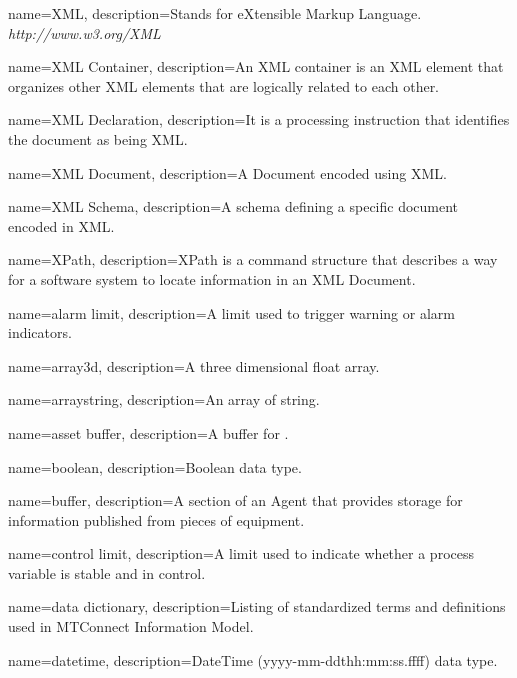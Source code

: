 {
    name={XML},
	description={Stands for eXtensible Markup Language. \textit{http://www.w3.org/XML}}
}

{
    name={XML Container},
	description={An XML container is an XML element that \glspl{organize} other XML elements that are logically related to each other. }
}

{
    name={XML Declaration},
	description={It is a processing instruction that identifies the document as being XML.}
}

{
    name={XML Document},
	description={A \gls{Document} encoded using XML.
}
}

{
    name={XML Schema},
	description={A \gls{schema} defining a specific document encoded in XML.
}
}

{
    name={XPath},
	description={\gls{XPath} is a command structure that describes a way for a software system to locate information in an \gls{XML Document}. }
}

{
    name={alarm limit},
	description={A limit used to trigger warning or alarm indicators.}
}

{
    name={array3d},
	description={A three dimensional \gls{float} array.}
}

{
    name={arraystring},
	description={An array of \gls{string}.}
}

{
    name={asset buffer},
	description={A \gls{buffer} for .}
}

{
    name={boolean},
	description={Boolean data type.}
}

{
    name={buffer},
	description={A section of an \gls{Agent} that provides storage for information published from pieces of equipment.}
}

{
    name={control limit},
	description={A limit used to indicate whether a process variable is stable and in control.}
}

{
    name={data dictionary},
	description={Listing of standardized terms and definitions used in \gls{MTConnect Information Model}.}
}

{
    name={datetime},
	description={DateTime (yyyy-mm-ddthh:mm:ss.ffff) data type.}
}

